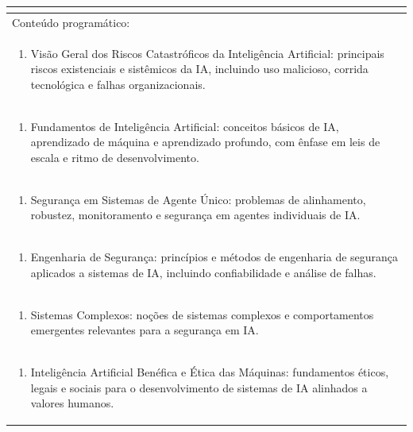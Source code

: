 \documentclass[11pt]{article}
\begin{document}
\begin{center}
\begin{longtable}{|p{4cm}|p{4cm}|p{4cm}|p{4cm}|}
\multicolumn{4}{|p{16cm}|}{}\\
\hline
\multicolumn{4}{|p{16cm}|}{Conteúdo programático:}\\*
\multicolumn{4}{|p{\dimexpr 16cm + 6\tabcolsep\relax}|}{\begin{enumerate}[start=1]\item Visão Geral dos Riscos Catastróficos da Inteligência Artificial: principais riscos existenciais e sistêmicos da IA, incluindo uso malicioso, corrida tecnológica e falhas organizacionais.\end{enumerate}}\\
\multicolumn{4}{|p{\dimexpr 16cm + 6\tabcolsep\relax}|}{\begin{enumerate}[start=2]\item Fundamentos de Inteligência Artificial: conceitos básicos de IA, aprendizado de máquina e aprendizado profundo, com ênfase em leis de escala e ritmo de desenvolvimento.\end{enumerate}}\\
\multicolumn{4}{|p{\dimexpr 16cm + 6\tabcolsep\relax}|}{\begin{enumerate}[start=3]\item Segurança em Sistemas de Agente Único: problemas de alinhamento, robustez, monitoramento e segurança em agentes individuais de IA.\end{enumerate}}\\
\multicolumn{4}{|p{\dimexpr 16cm + 6\tabcolsep\relax}|}{\begin{enumerate}[start=4]\item Engenharia de Segurança: princípios e métodos de engenharia de segurança aplicados a sistemas de IA, incluindo confiabilidade e análise de falhas.\end{enumerate}}\\
\multicolumn{4}{|p{\dimexpr 16cm + 6\tabcolsep\relax}|}{\begin{enumerate}[start=5]\item Sistemas Complexos: noções de sistemas complexos e comportamentos emergentes relevantes para a segurança em IA.\end{enumerate}}\\
\multicolumn{4}{|p{\dimexpr 16cm + 6\tabcolsep\relax}|}{\begin{enumerate}[start=6]\item Inteligência Artificial Benéfica e Ética das Máquinas: fundamentos éticos, legais e sociais para o desenvolvimento de sistemas de IA alinhados a valores humanos.\end{enumerate}}\\

\end{longtable}
\end{center}
\end{document}
